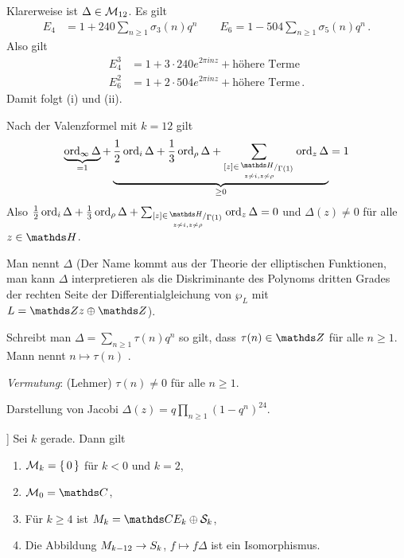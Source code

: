 \begin{bewe}
	Klarerweise ist $\Delta \in \mathcal{M}_{12}$.
	Es gilt
	\begin{align*}
	E_4 &= 1 + 240 \sum_{n\geq1} \sigma_3(n)q^n \qquad
	E_6 = 1 - 504\sum_{n \geq 1} \sigma_{5}(n)q^n
	\,.
	\end{align*}
	Also gilt
	\begin{align*}
	E_4^3 &= 1 + 3\cdot 240 e^{2\pi inz} + \text{höhere Terme} \\
	E_6^2 &= 1 + 2\cdot 504 e^{2\pi inz} + \text{höhere Terme}
	\,.
	\end{align*}
	Damit folgt (i) und (ii).
	
	Nach der Valenzformel mit $k=12$ gilt
	\[
	\underbrace{\ord_\infty \Delta}_{=1} + \underbrace{\frac{1}{2} \ord_i \Delta + \frac{1}{3} \ord_\rho \Delta + \sum_{\substack{[z] \in \modulo{\HH}{\Gamma(1)} \\ \scriptscriptstyle z \not\sim i, z\not\sim \rho}} \ord_z \Delta}_{\geq 0} = 1
	\]
	Also $\frac{1}{2} \ord_i \Delta + \frac{1}{3} \ord_\rho \Delta + \sum_{\substack{[z] \in \modulo{\HH}{\Gamma(1)} \\ \scriptscriptstyle z \not\sim i, z\not\sim \rho}} \ord_z \Delta = 0$ und $\Delta(z) \not= 0$ für alle $z\in\HH$.
\end{bewe}

\begin{beme-list}
	\item Man nennt $\Delta$  (Der Name kommt aus der Theorie der elliptischen Funktionen, man kann $\Delta$ interpretieren als die Diskriminante des Polynoms dritten Grades der rechten Seite der Differentialgleichung von $\wp_L$ mit $L = \ZZ z \oplus \ZZ$).
	
	\item Schreibt man $\Delta = \sum_{n \geq 1} \tau(n) q^n$ so gilt, dass $\tau(n) \in \ZZ$ für alle $n \geq 1$.
	Mann nennt $n \mapsto \tau(n)$ .
	
	\emph{Vermutung}: (Lehmer) $\tau(n) \not= 0$ für alle $n \geq 1$.
	
	\item Darstellung von Jacobi $\Delta(z) = q\prod_{n \geq 1} (1-q^n)^{24}$.
\end{beme-list}

\begin{koro}\label{koro:Mk}]
	Sei $k$ gerade.
	Dann gilt
	\begin{enumerate}
		\item $\mathcal{M}_k = \left\{\,0\,\right\}$ für $k < 0$ und $k=2$,
		\item $\M_0 = \CC$,
		\item Für $k \geq 4$ ist $M_k = \CC E_k \oplus \mathcal{S}_k$,
		\item Die Abbildung $M_{k-12} \rightarrow S_{k}$, $f \mapsto f\Delta$ ist ein Isomorphismus.
	\end{enumerate}
\end{koro}

